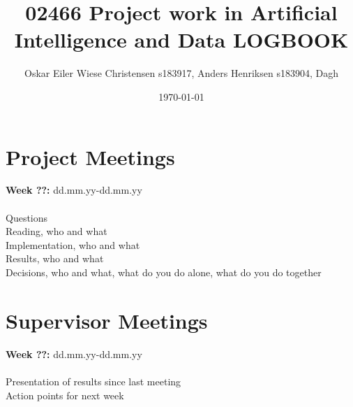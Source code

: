 \documentclass[11pt, fleqn]{article}
\title{02466 Project work in Artificial Intelligence and Data LOGBOOK}
\author{Oskar Eiler Wiese Christensen s183917, Anders Henriksen s183904, Dagh}
\date{\today}
\begin{document}
	\maketitle
		
\section*{Project Meetings}
	
	\textbf{Week ??:}  dd.mm.yy-dd.mm.yy \\\\
	\noindent
	Questions \\
	Reading, who and what \\
	Implementation, who and what \\
	Results, who and what \\
	Decisions, who and what, what do you do alone, what do you do together
	
\section*{Supervisor Meetings}
	
	\textbf{Week ??:}  dd.mm.yy-dd.mm.yy \\\\
	\noindent
	Presentation of results since last meeting \\
	Action points for next week
	
\end{document}
